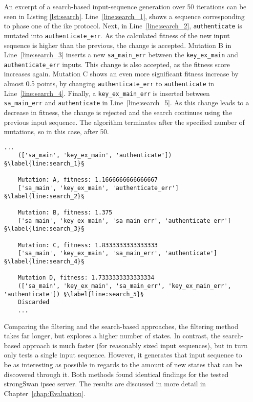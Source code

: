 An excerpt of a search-based input-sequence generation over 50 iterations can be seen in Listing \ref{lst:search}. 
Line~\ref{line:search_1}, shows a sequence corresponding to phase one of the \ac{ike} protocol. Next, in Line~\ref{line:search_2}, \texttt{authenticate} is mutated into \texttt{authenticate\_err}. As the calculated fitness of the new input sequence is higher than the previous, the change is accepted. Mutation B in Line~\ref{line:search_3} inserts a new \texttt{sa\_main\_err} between the \texttt{key\_ex\_main} and \texttt{authenticate\_err} inputs. This change is also accepted, as the fitness score increases again. Mutation C shows an even more significant fitness increase by almost 0.5 points, by changing \texttt{authenticate\_err} to \texttt{authenticate} in Line~\ref{line:search_4}. Finally, a \texttt{key\_ex\_main\_err} is inserted between \texttt{sa\_main\_err} and \texttt{authenticate} in Line~\ref{line:search_5}. As this change leads to a decrease in fitness, the change is rejected and the search continues using the previous input sequence. The algorithm terminates after the specified number of mutations, so in this case, after 50.

\begin{lstlisting}[float=h, caption=Search-based input-sequence generation example mutations., label=lst:search, escapechar=§]
	... 	
	(['sa_main', 'key_ex_main', 'authenticate']) §\label{line:search_1}§
	
	Mutation: A, fitness: 1.1666666666666667
	['sa_main', 'key_ex_main', 'authenticate_err'] §\label{line:search_2}§
	
	Mutation: B, fitness: 1.375
	['sa_main', 'key_ex_main', 'sa_main_err', 'authenticate_err'] §\label{line:search_3}§
	
	Mutation: C, fitness: 1.8333333333333333
	['sa_main', 'key_ex_main', 'sa_main_err', 'authenticate'] §\label{line:search_4}§
	
	Mutation D, fitness: 1.7333333333333334 
	(['sa_main', 'key_ex_main', 'sa_main_err', 'key_ex_main_err', 'authenticate']) §\label{line:search_5}§
	Discarded
	...
\end{lstlisting}

Comparing the filtering and the search-based approaches, the filtering method takes far longer, but explores a higher number of states. In contrast, the search-based approach is much faster (for reasonably sized input sequences), but in turn only tests a single input sequence. However, it generates that input sequence to be as interesting as possible in regards to the amount of new states that can be discovered through it. Both methods found identical findings for the tested strongSwan \ac{ipsec} server. The results are discussed in more detail in Chapter~\ref{chap:Evaluation}.

